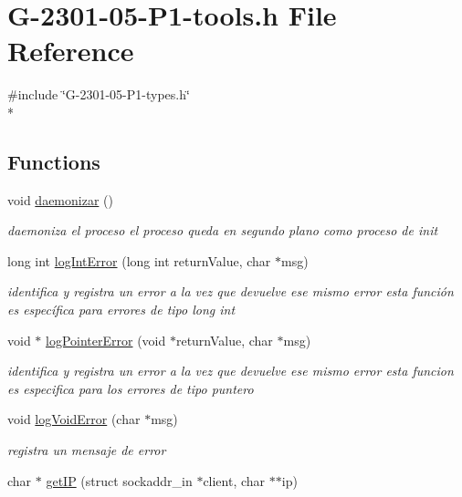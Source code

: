 \hypertarget{_g-2301-05-_p1-tools_8h}{\section{G-\/2301-\/05-\/\-P1-\/tools.h File Reference}
\label{_g-2301-05-_p1-tools_8h}
}
{\ttfamily \#include \char`\"{}G-\/2301-\/05-\/\-P1-\/types.\-h\char`\"{}}\\*
\subsection*{Functions}
\begin{DoxyCompactItemize}
\item 
void \hyperlink{_g-2301-05-_p1-tools_8h_a79f6ea5350079c571138b0a00af1f5a4}{daemonizar} ()
\begin{DoxyCompactList}\small\item\em daemoniza el proceso el proceso queda en segundo plano como proceso de init \end{DoxyCompactList}\item 
long int \hyperlink{_g-2301-05-_p1-tools_8h_a6349dfcf345b8d45a1be65e3e17739fe}{log\-Int\-Error} (long int return\-Value, char $\ast$msg)
\begin{DoxyCompactList}\small\item\em identifica y registra un error a la vez que devuelve ese mismo error esta función es específica para errores de tipo long int \end{DoxyCompactList}\item 
void $\ast$ \hyperlink{_g-2301-05-_p1-tools_8h_a192fd5bf4f47fe63d449f291f92732a9}{log\-Pointer\-Error} (void $\ast$return\-Value, char $\ast$msg)
\begin{DoxyCompactList}\small\item\em identifica y registra un error a la vez que devuelve ese mismo error esta funcion es especifica para los errores de tipo puntero \end{DoxyCompactList}\item 
void \hyperlink{_g-2301-05-_p1-tools_8h_a5b92fdc34c0427eb5cf8360e68aa9287}{log\-Void\-Error} (char $\ast$msg)
\begin{DoxyCompactList}\small\item\em registra un mensaje de error \end{DoxyCompactList}\item 
char $\ast$ \hyperlink{_g-2301-05-_p1-tools_8h_a2850885f03b7654d239b361940416bef}{get\-I\-P} (struct sockaddr\-\_\-in $\ast$client, char $\ast$$\ast$ip)
$$
\end{DoxyCompactItemize}
